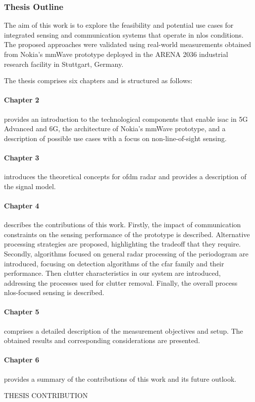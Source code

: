 \subsubsection{Thesis Outline}

The aim of this work is to explore the feasibility and potential use cases for integrated sensing and communication systems that operate in \gls{nlos} conditions.
The proposed approaches were validated using real-world measurements obtained from Nokia's mmWave prototype deployed in the ARENA 2036 industrial research facility in Stuttgart, Germany.

The thesis comprises six chapters and is structured as follows:

\paragraph{Chapter 2} provides an introduction to the technological components that enable \gls{isac} in \gls{5G} Advanced and 6G, the architecture of Nokia's mmWave prototype, and a description of possible use cases with a focus on non-line-of-sight sensing.

\paragraph{Chapter 3} introduces the theoretical concepts for \gls{ofdm} radar and provides a description of the signal model.

\paragraph{Chapter 4} describes the contributions of this work. Firstly, the impact of communication constraints on the sensing performance of the prototype is described. Alternative processing strategies are proposed, highlighting the tradeoff that they require.
Secondly, algorithms focused on general radar processing of the periodogram are introduced, focusing on detection algorithms of the \gls{cfar} family and their performance.
Then clutter characteristics in our system are introduced, addressing the processes used for clutter removal.
Finally, the overall process \gls{nlos}-focused sensing is described.

\paragraph{Chapter 5} comprises a detailed description of the measurement objectives and setup. The obtained results and corresponding considerations are presented.

\paragraph{Chapter 6} provides a summary of the contributions of this work and its future outlook.

\alert{THESIS CONTRIBUTION}
